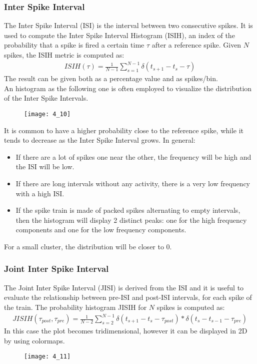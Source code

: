 \subsubsection{Inter Spike Interval}
The Inter Spike Interval (ISI) is the interval between two consecutive spikes. It is used to compute the Inter Spike Interval Histogram (ISIH), an index of the probability that a spike is fired a certain time \(\tau\) after a reference spike. Given \(N\) spikes, the ISIH metric is computed as:
\begin{align*}
    ISIH(\tau)=\frac{1}{N-1}\sum_{s=1}^{N-1}\delta{(t_{s+1}-t_{s}-\tau)}
\end{align*}
The result can be given both as a percentage value and as spikes/bin.\\
An histogram as the following one is often employed to visualize the distribution of the Inter Spike Intervals.
\begin{figure}[H]
    \texttt{[image: 4\_10]}
    \centering
\end{figure}
It is common to have a higher probability close to the reference spike, while it tends to decrease as the Inter Spike Interval grows. 
In general:
\begin{itemize}
    \item If there are a lot of spikes one near the other, the frequency will be high and the ISI will be low.
    \item If there are long intervals without any activity, there is a very low frequency with a high ISI.
    \item If the spike train is made of packed spikes alternating to empty intervals, then the histogram will display 2 distinct peaks: one for the high frequency components and one for the low frequency components.
\end{itemize}
For a small cluster, the distribution will be closer to 0.
\subsubsection{Joint Inter Spike Interval}
The Joint Inter Spike Interval (JISI) is derived from the ISI and it is useful to evaluate the
relationship between pre-ISI and post-ISI intervals, for each spike of the train.
The probability histogram JISIH for \(N\) spikes is computed as:
\begin{align*}
    JISIH(\tau_{post},\tau_{pre})=\frac{1}{N-2}\sum_{s=2}^{N-1}\delta{(t_{s+1}-t_{s}-\tau_{post})}\ast \delta{(t_s-t_{s-1}-\tau_{pre})}
\end{align*}
In this case the plot becomes tridimensional, however it can be displayed in 2D by using
colormaps.
\begin{figure}[H]
    \texttt{[image: 4\_11]}
    \centering
\end{figure}
